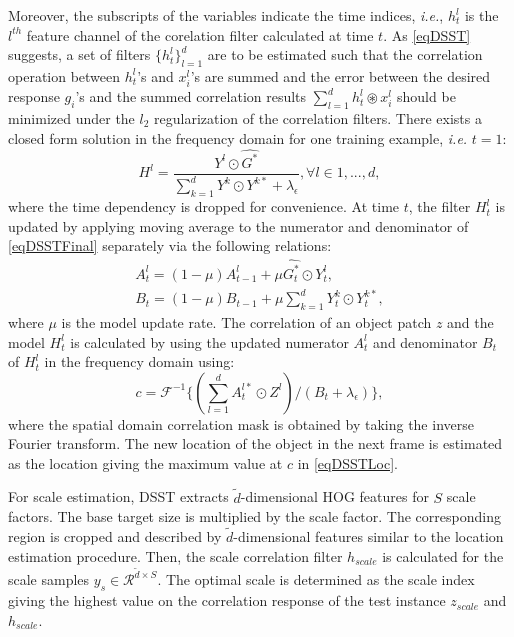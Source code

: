 \documentclass[journal]{IEEEtran}
\begin{document}
Moreover, the subscripts of the variables indicate the time indices, \emph{i.e.}, $h_t^l$ is the $l^{th}$ feature channel of the corelation filter calculated at time $t$. As \eqref{eqDSST} suggests, a set of filters $\{h_t^l\}_{l=1}^d$ are to be estimated such that the correlation operation between $h_t^l$'s and $x_i^l$'s are summed and the error between the desired response $\hat{g_i}$'s and the summed correlation results $\sum\limits_{l=1}^d h_t^l\circledast x_i^l$ should be minimized under the $l_2$ regularization of the correlation filters. There exists a closed form solution in the frequency domain for one training example, \emph{i.e.} $t=1$:
\begin{equation}
\label{eqDSSTFinal}
H^l = \frac{Y^l\odot \hat{G^*}}{\sum\limits_{k=1}^d Y^k\odot Y^{k*}+ \lambda_\epsilon}, \forall l \in {1,..., d},
\end{equation}
where the time dependency is dropped for convenience. At time $t$, the filter $H_t^l$ is updated by applying moving average to the numerator and denominator of \eqref{eqDSSTFinal} separately via the following relations:
\begin{equation}
\begin{split}
\label{eqDSSTUpdate}
A_t^l = (1-\mu)A_{t-1}^l+\mu \hat{G_t^{*}}\odot Y_t^l,\\
B_t = (1-\mu)B_{t-1}+\mu \sum\limits_{k=1}^d Y_{t}^k\odot Y_{t}^{k*},
\end{split}
\end{equation}
where $\mu$ is the model update rate. The correlation of an object patch $z$ and the model $H_t^l$ is calculated by using the updated numerator $A_t^l$ and denominator $B_t$ of $H_t^l$ in the frequency domain using:
\begin{equation}
\label{eqDSSTLoc}
c=\mathcal{F}^{-1}\{({\sum\limits_{l=1}^d A^{l*}_t\odot Z^l})/({B_t+\lambda_\epsilon})\},
\end{equation}
where the spatial domain correlation mask is obtained by taking the inverse Fourier transform.
The new location of the object in the next frame is estimated as the location giving the maximum value at $c$ in \eqref{eqDSSTLoc}. 

For scale estimation, DSST extracts $\tilde{d}$-dimensional HOG features for $S$ scale factors. The base target size is multiplied by the scale factor. The corresponding region is cropped and described by $\tilde{d}$-dimensional features similar to the location estimation procedure. Then, the scale correlation filter $h_{scale}$ is calculated for the scale samples $y_s \in \mathcal{R}^{\tilde{d}\times S}$. The optimal scale is determined as the scale index giving the highest value on the correlation response of the test instance $z_{scale}$ and $h_{scale}$.
\end{document}

